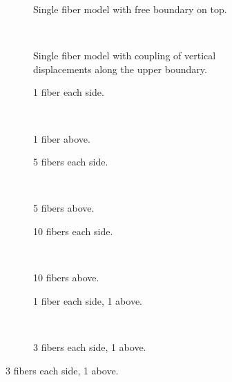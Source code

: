 \documentclass[review]{elsarticle}
\begin{document}
\begin{figure}[!h]
\centering
    \begin{subfigure}[b]{0.45\textwidth}
        \caption{Single fiber model with free boundary on top.}\label{subfig:volfracfreeMII}
    \end{subfigure} ~
    \begin{subfigure}[b]{0.45\textwidth}
        \caption{Single fiber model with coupling of vertical displacements along the upper boundary.}\label{subfig:volfraccouplingMII}
    \end{subfigure}

    \begin{subfigure}[b]{0.45\textwidth}
        \caption{1 fiber each side.}\label{subfig:volfrac1eachsideMII}
    \end{subfigure} ~
    \begin{subfigure}[b]{0.45\textwidth}
        \caption{1 fiber above.}\label{subfig:volfrac1aboveMII}
    \end{subfigure}

    \begin{subfigure}[b]{0.45\textwidth}
        \caption{5 fibers each side.}\label{subfig:volfrac5eachsideMII}
    \end{subfigure} ~
    \begin{subfigure}[b]{0.45\textwidth}
        \caption{5 fibers above.}\label{subfig:volfrac5aboveMII}
    \end{subfigure}

    \begin{subfigure}[b]{0.45\textwidth}
        \caption{10 fibers each side.}\label{subfig:volfrac10eachsideMII}
    \end{subfigure} ~
    \begin{subfigure}[b]{0.45\textwidth}
        \caption{10 fibers above.}\label{subfig:volfrac10aboveMII}
    \end{subfigure}

    \begin{subfigure}[b]{0.45\textwidth}
        \caption{1 fiber each side, 1 above.}\label{subfig:volfrac1eachside1aboveMII}
    \end{subfigure} ~
    \begin{subfigure}[b]{0.45\textwidth}
        \caption{3 fibers each side, 1 above.}\label{subfig:volfrac3eachside1aboveMII}
    \end{subfigure}


\end{figure}
\end{document}
